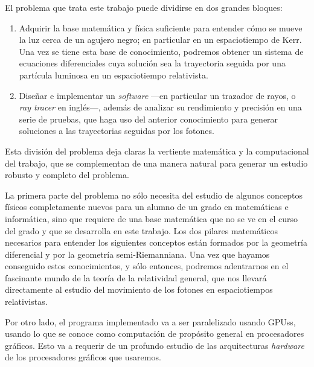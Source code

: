 El problema que trata este trabajo puede dividirse en dos grandes bloques:
\begin{enumerate}
	\item Adquirir la base matemática y física suficiente para entender cómo se mueve la luz cerca de un agujero negro; en particular en un espaciotiempo de Kerr. Una vez se tiene esta base de conocimiento, podremos obtener un sistema de ecuaciones diferenciales cuya solución sea la trayectoria seguida por una partícula luminosa en un espaciotiempo relativista.
	\item Diseñar e implementar un \emph{software} ---en particular un trazador de rayos, o \emph{ray tracer} en inglés---, además de analizar su rendimiento y precisión en una serie de pruebas, que haga uso del anterior conocimiento para generar soluciones a las trayectorias seguidas por los fotones. 
\end{enumerate}

Esta división del problema deja claras la vertiente matemática y la computacional del trabajo, que se complementan de una manera natural para generar un estudio robusto y completo del problema.

La primera parte del problema no sólo necesita del estudio de algunos conceptos físicos completamente nuevos para un alumno de un grado en matemáticas e informática, sino que requiere de una base matemática que no se ve en el curso del grado y que se desarrolla en este trabajo. Los dos pilares matemáticos necesarios para entender los siguientes conceptos están formados por la geometría diferencial y por la geometría semi-Riemanniana. Una vez que hayamos conseguido estos conocimientos, y sólo entonces, podremos adentrarnos en el fascinante mundo de la teoría de la relatividad general, que nos llevará directamente al estudio del movimiento de los fotones en espaciotiempos relativistas.

Por otro lado, el programa implementado va a ser paralelizado usando \acp{GPU}s, usando lo que se conoce como computación de propósito general en procesadores gráficos. Esto va a requerir de un profundo estudio de las arquitecturas \emph{hardware} de los procesadores gráficos que usaremos.

\vfill

\endgroup
